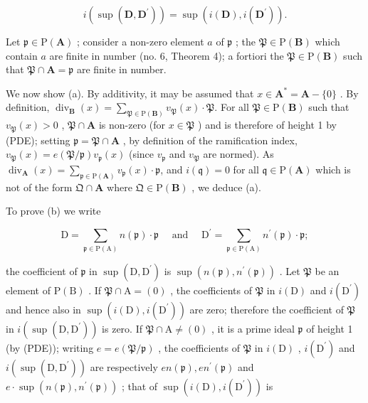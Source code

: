 \[
i \left(\sup (\mathbf {D}, \mathbf {D} ^ {\prime})\right) = \sup (i (\mathbf {D}), i (\mathbf {D} ^ {\prime})).
\]

Let \(\mathfrak{p} \in \mathrm{P}(\mathbf{A})\) ; consider a non-zero element \(a\) of \(\mathfrak{p}\) ; the \(\mathfrak{P} \in \mathrm{P}(\mathbf{B})\) which contain \(a\) are finite in number (no. 6, Theorem 4); a fortiori the \(\mathfrak{P} \in \mathrm{P}(\mathbf{B})\) such that \(\mathfrak{P} \cap \mathbf{A} = \mathfrak{p}\) are finite in number.

We now show (a). By additivity, it may be assumed that \(x \in \mathbf{A}^* = \mathbf{A} - \{0\}\) . By definition, \(\operatorname{div}_{\mathbf{B}}(x) = \sum_{\mathfrak{P} \in \mathrm{P}(\mathbf{B})} v_{\mathfrak{P}}(x) \cdot \mathfrak{P}\). For all \(\mathfrak{P} \in \mathrm{P}(\mathbf{B})\) such that \(v_{\mathfrak{P}}(x) > 0\) , \(\mathfrak{P} \cap \mathbf{A}\) is non-zero (for \(x \in \mathfrak{P}\) ) and is therefore of height 1 by (PDE); setting \(\mathfrak{p} = \mathfrak{P} \cap \mathbf{A}\) , by definition of the ramification index, \(v_{\mathfrak{P}}(x) = e(\mathfrak{P}/\mathfrak{p})v_{\mathfrak{p}}(x)\) (since \(v_{\mathfrak{p}}\) and \(v_{\mathfrak{P}}\) are normed). As \(\operatorname{div}_{\mathbf{A}}(x) = \sum_{\mathfrak{p} \in \mathrm{P}(\mathbf{A})} v_{\mathfrak{p}}(x) \cdot \mathfrak{p}\), and \(i(\mathfrak{q}) = 0\) for all \(\mathfrak{q} \in \mathrm{P}(\mathbf{A})\) which is not of the form \(\mathfrak{Q} \cap \mathbf{A}\) where \(\mathfrak{Q} \in \mathrm{P}(\mathbf{B})\) , we deduce (a).

To prove (b) we write

\[
\mathrm{D} = \sum_ {\mathfrak {p} \in \mathrm{P} (\mathrm{A})} n (\mathfrak {p}) \cdot \mathfrak {p} \quad \text { and } \quad \mathrm{D} ^ {\prime} = \sum_ {\mathfrak {p} \in \mathrm{P} (\mathrm{A})} n ^ {\prime} (\mathfrak {p}) \cdot \mathfrak {p};
\]

the coefficient of \(\mathfrak{p}\) in \(\sup (\mathrm{D},\mathrm{D}^{\prime})\) is \(\sup (n(\mathfrak{p}),n^{\prime}(\mathfrak{p}))\) . Let \(\mathfrak{P}\) be an element of \(\mathrm{P(B)}\) . If \(\mathfrak{P}\cap \mathrm{A} = (0)\) , the coefficients of \(\mathfrak{P}\) in \(i(\mathrm{D})\) and \(i(\mathrm{D}^{\prime})\) and hence also in \(\sup (i(\mathrm{D}),i(\mathrm{D}^{\prime}))\) are zero; therefore the coefficient of \(\mathfrak{P}\) in \(i(\sup (\mathrm{D},\mathrm{D}^{\prime}))\) is zero. If \(\mathfrak{P}\cap \mathrm{A}\neq (0)\) , it is a prime ideal \(\mathfrak{p}\) of height 1 (by (PDE)); writing \(e = e(\mathfrak{P} / \mathfrak{p})\) , the coefficients of \(\mathfrak{P}\) in \(i(\mathrm{D})\) , \(i(\mathrm{D}^{\prime})\) and \(i(\sup (\mathrm{D},\mathrm{D}^{\prime}))\) are respectively \(en(\mathfrak{p}),en^{\prime}(\mathfrak{p})\) and \(e \cdot\sup (n(\mathfrak{p}),n^{\prime}(\mathfrak{p}))\) ; that of \(\sup (i(\mathrm{D}),i(\mathrm{D}^{\prime}))\) is

